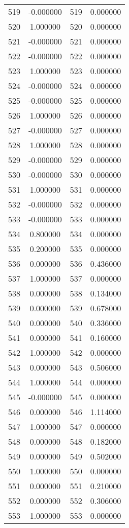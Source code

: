 \documentclass[12pt]{article}
\begin{document}
\begin{longtable}{@{}cccc@{}}
519 & -0.000000 & 519 & 0.000000 \\
520 & 1.000000 & 520 & 0.000000 \\
521 & -0.000000 & 521 & 0.000000 \\
522 & -0.000000 & 522 & 0.000000 \\
523 & 1.000000 & 523 & 0.000000 \\
524 & -0.000000 & 524 & 0.000000 \\
525 & -0.000000 & 525 & 0.000000 \\
526 & 1.000000 & 526 & 0.000000 \\
527 & -0.000000 & 527 & 0.000000 \\
528 & 1.000000 & 528 & 0.000000 \\
529 & -0.000000 & 529 & 0.000000 \\
530 & -0.000000 & 530 & 0.000000 \\
531 & 1.000000 & 531 & 0.000000 \\
532 & -0.000000 & 532 & 0.000000 \\
533 & -0.000000 & 533 & 0.000000 \\
534 & 0.800000 & 534 & 0.000000 \\
535 & 0.200000 & 535 & 0.000000 \\
536 & 0.000000 & 536 & 0.436000 \\
537 & 1.000000 & 537 & 0.000000 \\
538 & 0.000000 & 538 & 0.134000 \\
539 & 0.000000 & 539 & 0.678000 \\
540 & 0.000000 & 540 & 0.336000 \\
541 & 0.000000 & 541 & 0.160000 \\
542 & 1.000000 & 542 & 0.000000 \\
543 & 0.000000 & 543 & 0.506000 \\
544 & 1.000000 & 544 & 0.000000 \\
545 & -0.000000 & 545 & 0.000000 \\
546 & 0.000000 & 546 & 1.114000 \\
547 & 1.000000 & 547 & 0.000000 \\
548 & 0.000000 & 548 & 0.182000 \\
549 & 0.000000 & 549 & 0.502000 \\
550 & 1.000000 & 550 & 0.000000 \\
551 & 0.000000 & 551 & 0.210000 \\
552 & 0.000000 & 552 & 0.306000 \\
553 & 1.000000 & 553 & 0.000000 \\

\end{longtable}
\end{document}
